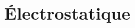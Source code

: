 \documentclass[
    11pt,
    a4paper,
    oneside,
    headinlcude, footinclude,
    twoside,
]{report}
\renewcommand{\vec}[1]{\overrightarrow{#1}}
\begin{document}












\chapter{Électrostatique}
\label{cha:electrostatique}
\end{document}
